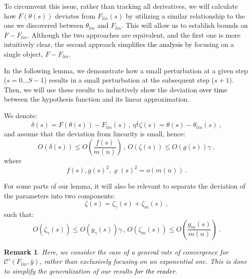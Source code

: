 \documentclass{article} %
\newtheorem{remark}{Remark}
[section]
\begin{document}
To circumvent this issue, rather than tracking all derivatives, we will calculate how \(F\left(\theta\left(s\right)\right)\) deviates from \(F_{lin}\left(s\right)\) by utilizing a similar relationship to the one we discovered between \(\theta_{lin}\) and \(F_{lin}\). This will allow us to establish bounds on \(F-F_{lin}\). Although the two approaches are equivalent, and the first one is more intuitively clear, the second approach simplifies \textcolor{black}{the analysis} by focusing on a single object, \(F-F_{lin}\).

In the following lemma, we demonstrate how a small perturbation at a given step (\(s=0\ldots S-1\)) results in a small perturbation at the subsequent step (\(s+1\)). Then, we will use these results to inductively show the deviation \textcolor{black}{over time} between the hypothesis function and its linear approximation.

We denote:
\begin{equation}
\delta(s)=F\left(\theta\left(s\right)\right)-F_{lin}\left(s\right)\,,\,
\eta^{\frac{1}{2}}\zeta(s)=
\theta(s)-\theta_{lin}(s) \ ,
\label{eq:WW}
\end{equation}
and assume that the deviation from linearity is small, hence:
\begin{equation}
O\left(\delta(s)\right)
\leq
O\left(\frac{f(s)}{m(n)}\right)
\,,\,
O\left(\zeta\left(s\right)\right)\leq O\left(g\left(s\right)\right)\gamma \ ,
\label{Zap:eq:OldLadyJobJustification}
\end{equation}
where
\begin{equation}
f\left(s\right),g\left(s\right)^{2},\varrho\left(s\right)^{2}=o\left(m\left(n\right)\right) \ .
\end{equation}

For some parts of our lemma, it will also be relevant to separate the deviation of the parameters into two components:
\begin{equation}
\zeta\left(s\right)=\zeta_{\gamma}\left(s\right)+\zeta_{m}\left(s\right) \ ,
\end{equation}
such that:
\begin{equation}
O\left(\zeta_{\gamma}\left(s\right)\right)\leq O\left(g_{\gamma}\left(s\right)\right)\gamma\,,\,O\left(\zeta_{m}\left(s\right)\right)\leq O\left(\frac{g_{m}\left(s\right)}{m\left(n\right)}\right) \ .
\end{equation}

\begin{remark}
\textup{Here, we consider the case of a general rate of convergence for \(\mathcal{C}'\left(F_{lin},\hat{y}\right)\), rather than exclusively focusing on an exponential one. This is done to simplify the generalization of our results \textcolor{black}{for the reader}.}
\end{remark}
\end{document}
